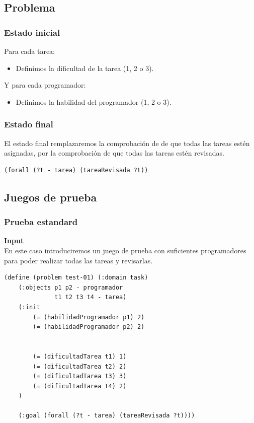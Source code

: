\documentclass[11pt]{article}
\begin{document}
\subsection{Problema}
\subsubsection{Estado inicial}

Para cada tarea:
\begin{itemize}
  	\item Definimos la dificultad de la tarea (1, 2 o 3).
\end{itemize}

\noindent
Y para cada programador:
\begin{itemize}
  	\item Definimos la habilidad del programador (1, 2 o 3).
\end{itemize}

\subsubsection{Estado final}

El estado final remplazaremos la comprobación de de que todas las tareas estén asignadas, por la comprobación de que todas las tareas estén revisadas.
\begin{verbatim}
(forall (?t - tarea) (tareaRevisada ?t))
\end{verbatim}
\subsection{Juegos de prueba}

\subsubsection{Prueba estandard}
\underline{\textbf{Input}}\\

En este caso introduciremos un juego de prueba con suficientes programadores para poder realizar todas las tareas y revisarlas.
\begin{verbatim}
(define (problem test-01) (:domain task)
    (:objects p1 p2 - programador
			  t1 t2 t3 t4 - tarea)
    (:init
        (= (habilidadProgramador p1) 2)
        (= (habilidadProgramador p2) 2)
        
        
        (= (dificultadTarea t1) 1)
        (= (dificultadTarea t2) 2)
        (= (dificultadTarea t3) 3)
        (= (dificultadTarea t4) 2)
    )

    (:goal (forall (?t - tarea) (tareaRevisada ?t))))
 \end{verbatim}
 \medskip
 
\end{document}
